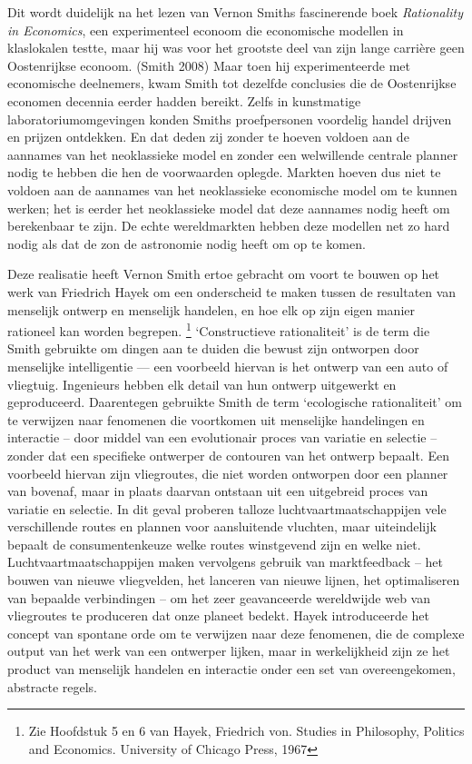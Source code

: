\documentclass[
  a5paper,
  smalldemyvopaper,11pt,twoside,onecolumn,openright,extrafontsizes,
hidelinks]{memoir}
\begin{document}
Dit wordt duidelijk na het lezen van Vernon Smiths fascinerende boek
\emph{Rationality in Economics}, een experimenteel econoom die
economische modellen in klaslokalen testte, maar hij was voor het
grootste deel van zijn lange carrière geen Oostenrijkse econoom. (Smith
2008) Maar toen hij experimenteerde met economische deelnemers, kwam
Smith tot dezelfde conclusies die de Oostenrijkse economen decennia
eerder hadden bereikt. Zelfs in kunstmatige laboratoriumomgevingen
konden Smiths proefpersonen voordelig handel drijven en prijzen
ontdekken. En dat deden zij zonder te hoeven voldoen aan de aannames van
het neoklassieke model en zonder een welwillende centrale planner nodig
te hebben die hen de voorwaarden oplegde. Markten hoeven dus niet te
voldoen aan de aannames van het neoklassieke economische model om te
kunnen werken; het is eerder het neoklassieke model dat deze aannames
nodig heeft om berekenbaar te zijn. De echte wereldmarkten hebben deze
modellen net zo hard nodig als dat de zon de astronomie nodig heeft om
op te komen.

Deze realisatie heeft Vernon Smith ertoe gebracht om voort te bouwen op
het werk van Friedrich Hayek om een onderscheid te maken tussen de
resultaten van menselijk ontwerp en menselijk handelen, en hoe elk op
zijn eigen manier rationeel kan worden begrepen. \footnote{Zie Hoofdstuk
  5 en 6 van Hayek, Friedrich von. Studies in Philosophy, Politics and
  Economics. University of Chicago Press, 1967} `Constructieve
rationaliteit' is de term die Smith gebruikte om dingen aan te duiden
die bewust zijn ontworpen door menselijke intelligentie --- een
voorbeeld hiervan is het ontwerp van een auto of vliegtuig. Ingenieurs
hebben elk detail van hun ontwerp uitgewerkt en geproduceerd.
Daarentegen gebruikte Smith de term `ecologische rationaliteit' om te
verwijzen naar fenomenen die voortkomen uit menselijke handelingen en
interactie -- door middel van een evolutionair proces van variatie en
selectie -- zonder dat een specifieke ontwerper de contouren van het
ontwerp bepaalt. Een voorbeeld hiervan zijn vliegroutes, die niet worden
ontworpen door een planner van bovenaf, maar in plaats daarvan ontstaan
uit een uitgebreid proces van variatie en selectie. In dit geval
proberen talloze luchtvaartmaatschappijen vele verschillende routes en
plannen voor aansluitende vluchten, maar uiteindelijk bepaalt de
consumentenkeuze welke routes winstgevend zijn en welke niet.
Luchtvaartmaatschappijen maken vervolgens gebruik van marktfeedback --
het bouwen van nieuwe vliegvelden, het lanceren van nieuwe lijnen, het
optimaliseren van bepaalde verbindingen -- om het zeer geavanceerde
wereldwijde web van vliegroutes te produceren dat onze planeet bedekt.
Hayek introduceerde het concept van spontane orde om te verwijzen naar
deze fenomenen, die de complexe output van het werk van een ontwerper
lijken, maar in werkelijkheid zijn ze het product van menselijk handelen
en interactie onder een set van overeengekomen, abstracte regels.
\end{document}
